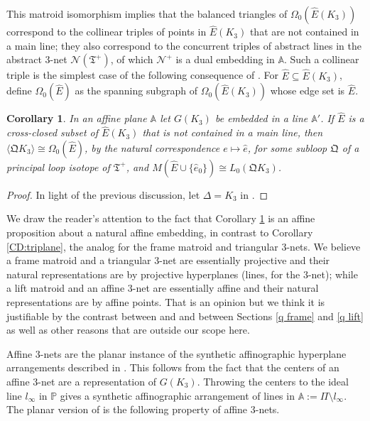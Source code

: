 \documentclass[reqno,12pt]{amsart}
\newcommand \comment[1]{}				%
\newtheorem{cor}[thm]{Corollary}
\theoremstyle{remark}
\numberwithin{equation}{section}
\numberwithin{figure}{section}
\newcommand \bgr[1]{\langle#1\rangle}
\newcommand \cN{\mathcal{N}}
\newcommand \bbA{\mathbb{A}}
\newcommand \bbP{\mathbb{P}}
\newcommand \fQ{\mathfrak Q}
\newcommand \fT{\mathfrak T}
\newcommand \he{{\hat e}}
\newcommand \hE{{\hat E}}
\newcommand\PP{\Pi}	%
\newcommand\mencev{\cite[Section 2\comment{mencev}]{BG6} }		%
\newcommand\ortho{\cite[Section 3\comment{ortho}]{BG6} }		%
\newcommand\orthoaffino{\cite[Section 3.2\comment{orthoaffino}]{BG6} }	%
\begin{document}
This matroid isomorphism implies that the balanced triangles of $\Omega_0(\hE(K_3))$ correspond to the collinear triples of points in $\hE(K_3)$ that are not contained in a main line; they also correspond to the concurrent triples of abstract lines in the abstract $3$-net $\cN(\fT^+)$, of which $\cN^+$ is a dual embedding in $\bbA$.  
Such a collinear triple is the simplest case of the following consequence of \cite[Corollary 4.5]{BG6}.  For $\hE \subseteq \hE(K_3)$, define $\Omega_0(\hE)$ as the spanning subgraph of $\Omega_0(\hE(K_3))$ whose edge set is $\hE$.

\begin{cor} \label{CD:orthoplane}
In an affine plane $\bbA$ let $G(K_3)$ be embedded in a line $\bbA'$.  If $\hE$ is a cross-closed subset of $\hE(K_3)$ that is not contained in a main line, then $\bgr{\fQ K_3} \cong \Omega_0(\hE)$, by the natural correspondence $e \mapsto \he$, for some subloop $\fQ$ of a principal loop isotope of $\fT^+$, and $M(\hE \cup \{\he_0\}) \cong L_0(\fQ K_3)$.  
\end{cor}

\begin{proof}
In light of the previous discussion, let $\Delta = K_3$ in \cite[Corollary 4.5]{BG6}.
\end{proof}

We draw the reader's attention to the fact that Corollary \ref{CD:orthoplane} is an affine proposition about a natural affine embedding, in contrast to Corollary \ref{CD:triplane}, the analog for the frame matroid and triangular $3$-nets.  We believe a frame matroid and a triangular $3$-net are essentially projective and their natural representations are by projective hyperplanes (lines, for the $3$-net); while a lift matroid and an affine $3$-net are essentially affine and their natural representations are by affine points.  That is an opinion but we think it is justifiable by the contrast between \mencev and \ortho and between Sections \ref{q frame} and \ref{q lift} as well as other reasons that are outside our scope here.

Affine $3$-nets are the planar instance of the synthetic affinographic hyperplane arrangements described in \orthoaffino.  This follows from the fact that the centers of an affine $3$-net are a representation of $G(K_3)$.  Throwing the centers to the ideal line $l_\infty$ in $\bbP$ gives a synthetic affinographic arrangement of lines in $\bbA := \PP \setminus l_\infty$.  The planar version of \cite[Corollary 3.12\comment{C:affinoexpansion}]{BG6} is the following property of affine $3$-nets.  
\end{document}
